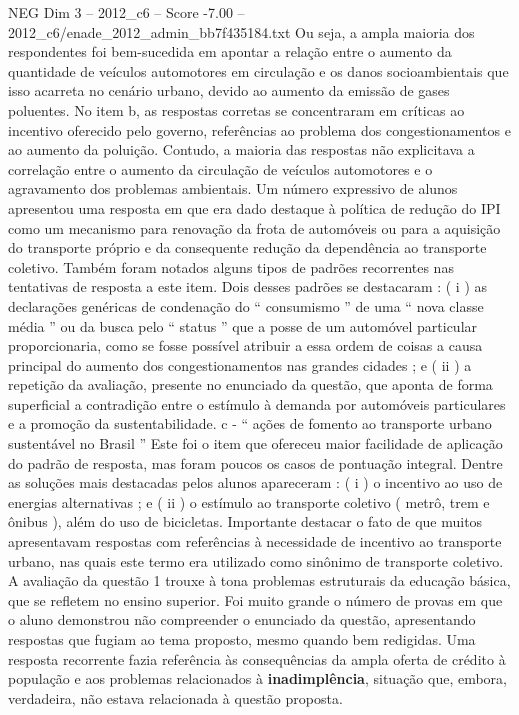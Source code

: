 \begin{textsample}{NEG Dim 3 – 2012\_c6 – Score -7.00 – 2012\_c6/enade\_2012\_admin\_bb7f435184.txt}
Ou seja, a ampla maioria dos respondentes foi bem-sucedida em apontar a relação entre o aumento da quantidade de veículos automotores em circulação e os danos socioambientais que isso acarreta no cenário urbano, devido ao aumento da emissão de gases poluentes.
No item b, as respostas corretas se concentraram em críticas ao incentivo oferecido pelo governo, referências ao problema dos congestionamentos e ao aumento da poluição.
Contudo, a maioria das respostas não explicitava a correlação entre o aumento da circulação de veículos automotores e o agravamento dos problemas ambientais.
Um número expressivo de alunos apresentou uma resposta em que era dado destaque à política de redução do IPI como um mecanismo para renovação da frota de automóveis ou para a aquisição do transporte próprio e da consequente redução da dependência ao transporte coletivo.
Também foram notados alguns tipos de padrões recorrentes nas tentativas de resposta a este item.
Dois desses padrões se destacaram : ( i ) as declarações genéricas de condenação do “ consumismo ” de uma “ nova classe média ” ou da busca pelo “ status ” que a posse de um automóvel particular proporcionaria, como se fosse possível atribuir a essa ordem de coisas a causa principal do aumento dos congestionamentos nas grandes cidades ; e ( ii ) a repetição da avaliação, presente no enunciado da questão, que aponta de forma superficial a contradição entre o estímulo à demanda por automóveis particulares e a promoção da sustentabilidade. c - “ ações de fomento ao transporte urbano sustentável no Brasil ” Este foi o item que ofereceu maior facilidade de aplicação do padrão de resposta, mas foram poucos os casos de pontuação integral.
Dentre as soluções mais destacadas pelos alunos apareceram : ( i ) o incentivo ao uso de energias alternativas ; e ( ii ) o estímulo ao transporte coletivo ( metrô, trem e ônibus ), além do uso de bicicletas.
Importante destacar o fato de que muitos apresentavam respostas com referências à necessidade de incentivo ao transporte urbano, nas quais este termo era utilizado como sinônimo de transporte coletivo.
A avaliação da questão 1 trouxe à tona problemas estruturais da educação básica, que se refletem no ensino superior.
Foi muito grande o número de provas em que o aluno demonstrou não compreender o enunciado da questão, apresentando respostas que fugiam ao tema proposto, mesmo quando bem redigidas.
Uma resposta recorrente fazia referência às consequências da ampla oferta de crédito à população e aos problemas relacionados à \textbf{inadimplência}, situação que, embora, verdadeira, não estava relacionada à questão proposta.

\end{textsample}
